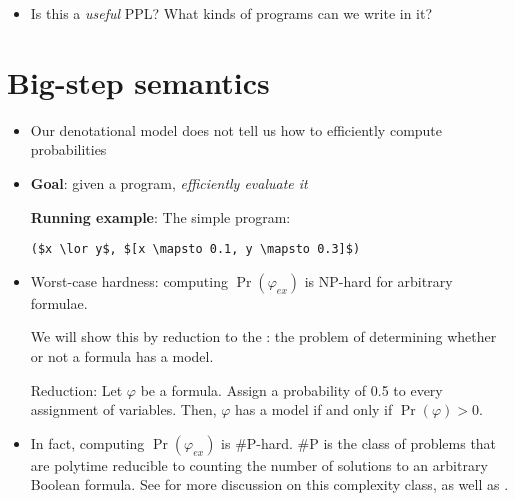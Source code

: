 \documentclass{tufte-handout}
\begin{document}
\begin{itemize}
  \item Is this a \emph{useful} PPL? What kinds of programs 
  can we write in it?
\end{itemize}

\section{Big-step semantics}
\begin{itemize}
  \item Our denotational model does not tell us how to efficiently compute probabilities
  \item \textbf{Goal}: given a \prop{} program, \emph{efficiently evaluate it}

    \textbf{Running example}: The simple \prop{} program:
\begin{lstlisting}[mathescape=true]
($x \lor y$, $[x \mapsto 0.1, y \mapsto 0.3]$)
\end{lstlisting}

    \item Worst-case hardness: computing $\Pr(\varphi_{ex})$ is NP-hard for 
    arbitrary formulae.

    We will show this by reduction to the : the problem of
    determining whether or not a formula has a model.

    Reduction: Let $\varphi$ be a formula. Assign a probability of 0.5 to 
    every assignment of variables. Then, $\varphi$ has a model if and 
    only if $\Pr(\varphi) > 0$.
    
    \item In fact, computing $\Pr(\varphi_{ex})$ is \#P-hard. 
    \#P is the class of problems that are polytime reducible to counting 
    the number of solutions to an arbitrary Boolean formula.
    See \citet[Chapter
    6]{goldreich2008computational} for more discussion on this complexity class, 
    as well as \citet{roth1996hardness}.
\end{itemize}
\end{document}
